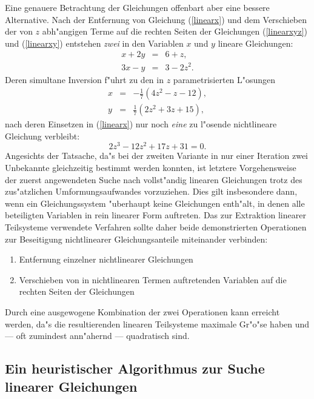Eine genauere Betrachtung der Gleichungen offenbart aber eine bessere 
Alternative. Nach der Entfernung von Gleichung (\ref{linearx}) und dem
Verschieben der von $z$ abh"angigen Terme auf die rechten Seiten der
Gleichungen (\ref{linearxyz}) und (\ref{linearxy}) entstehen {\em zwei}
in den Variablen $x$ und $y$ lineare Gleichungen:
\begin{eqnarray}
 x + 2y &=& 6 + z,    \label{linsub1} \\
3x -  y &=& 3 - 2z^2. \label{linsub2}
\end{eqnarray}
Deren simultane Inversion f"uhrt zu den in $z$ parametrisierten 
L"osungen
\begin{eqnarray}
x &=& -\frac{1}{7} \left( 4z^2 -  z - 12  \right), \\
y &=&  \frac{1}{7} \left( 2z^2 + 3z + 15  \right),
\end{eqnarray}
nach deren Einsetzen in (\ref{linearx}) nur noch {\em eine} zu 
l"osende nichtlineare Gleichung verbleibt:
\begin{equation}
2 z^3 - 12 z^2 + 17 z + 31 = 0.
\end{equation}
Angesichts der Tatsache, da"s bei der zweiten Variante in nur einer
Iteration zwei Unbekannte gleichzeitig bestimmt werden konnten, ist
letztere Vorgehensweise der zuerst angewendeten Suche nach vollst"andig 
linearen Gleichungen trotz des zus"atzlichen Umformungsaufwandes
vorzuziehen. Dies gilt insbesondere dann, wenn ein Gleichungssystem
"uberhaupt keine Gleichungen enth"alt, in denen alle beteiligten
Variablen in rein linearer Form auftreten. Das zur Extraktion linearer 
Teilsysteme verwendete Verfahren sollte daher beide demonstrierten
Operationen zur Beseitigung nichtlinearer Gleichungsanteile miteinander
verbinden:
\begin{enumerate}
\item Entfernung einzelner nichtlinearer Gleichungen
\item Verschieben von in nichtlinearen Termen auftretenden Variablen auf 
die rechten Seiten der Gleichungen 
\end{enumerate}
Durch eine ausgewogene Kombination der zwei Operationen kann erreicht
werden, da"s die resultierenden linearen Teilsysteme maximale Gr"o"se haben 
und --- oft zumindest ann"ahernd --- quadratisch sind.

\subsection{\label{HeurAlgoLin}Ein heuristischer Algorithmus zur Suche
linearer Gleichungen}

